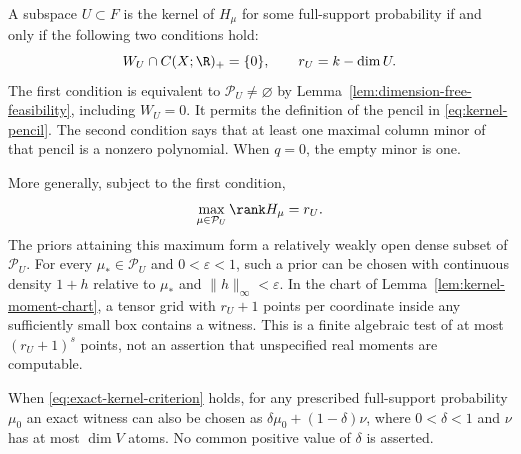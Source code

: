 \begin{theorem}
\label{thm:exact-kernel}
A subspace $U\subset F$ is the kernel of $H_\mu$ for some full-support
probability if and only if the following two conditions hold:
\begin{equation}\label{eq:exact-kernel-criterion}
 W_U\cap C(X;\R)_+=\{0\},\qquad r_U=k-\dim U.
\end{equation}
The first condition is equivalent to $\mathcal P_U\ne\varnothing$
by Lemma~\ref{lem:dimension-free-feasibility}, including $W_U=0$.
It permits the definition of the pencil in \eqref{eq:kernel-pencil}. The second condition says that at
least one maximal column minor of that pencil is a nonzero polynomial.
When $q=0$, the empty minor is one.

More generally, subject to the first condition,
\begin{equation}\label{eq:kernel-slice-max-rank}
 \max_{\mu\in\mathcal P_U}\rank H_\mu=r_U.
\end{equation}
The priors attaining this maximum form a relatively weakly open dense
subset of $\mathcal P_U$. For every $\mu_*\in\mathcal P_U$ and
$0<\varepsilon<1$, such a prior can be chosen with continuous density
$1+h$ relative to $\mu_*$ and $\|h\|_\infty<\varepsilon$.
In the chart of Lemma~\ref{lem:kernel-moment-chart}, a tensor grid with
$r_U+1$ points per coordinate inside any sufficiently small box contains
a witness. This is a finite algebraic test of at most $(r_U+1)^s$
points, not an assertion that unspecified real moments are computable.

When \eqref{eq:exact-kernel-criterion} holds, for any prescribed
full-support probability $\mu_0$ an exact witness can also be chosen as
$\delta\mu_0+(1-\delta)\nu$, where $0<\delta<1$ and $\nu$ has at
most $\dim V$ atoms. No common positive value of $\delta$ is asserted.
\end{theorem}
